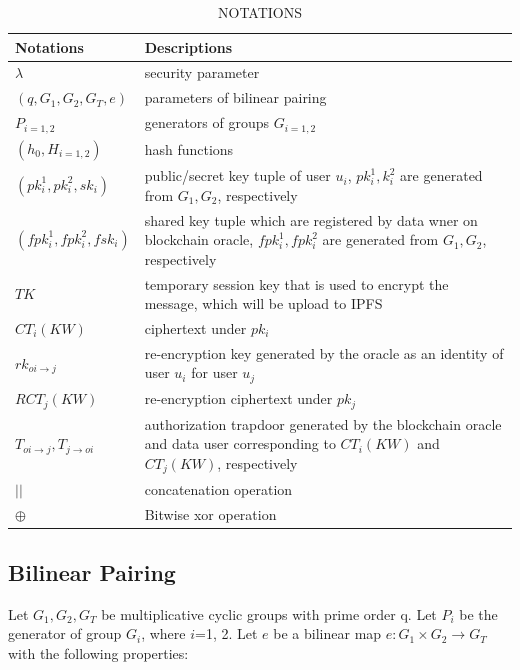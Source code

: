 \documentclass[journal]{IEEEtran}
\begin{document}
\begin{table}[t!]
\caption{NOTATIONS}
\label{tab:notation}
\centering
\begin{tabular}{ |p{2.3cm}|p{5.5cm}|}
\hline
    Notations & Descriptions \\
\hline
    $\lambda$ & security parameter \\
\hline
    $(q, G_1, G_2, G_T, e)$ & parameters of bilinear pairing \\
\hline
    $P_{i=1,2}$ & generators of groups $G_{i=1,2}$ \\
\hline
    $(h_0, H_{i=1,2})$ & hash functions \\
\hline
    $(pk_i^1, pk_i^2, sk_i)$ & public/secret key tuple of user $u_i$, $pk_i^1, k_i^2$ are generated from $G_1, G_2$, respectively \\
\hline
    $(fpk_i^1, fpk_i^2, fsk_i)$ & shared key tuple which are registered by data wner on blockchain oracle, $fpk_i^1, fpk_i^2$ are generated from $G_1, G_2$, respectively  \\
\hline
    $TK$ & temporary session key that is used to encrypt the message, which will be upload to IPFS \\
\hline
    $CT_i(KW)$ & ciphertext under $pk_i$ \\
\hline
    $rk_{oi \to j}$ & re-encryption key generated by the oracle as an identity of user $u_i$ for user $u_j$ \\
\hline
    $RCT_j(KW)$ & re-encryption ciphertext under $pk_j$ \\
\hline
    $T_{oi \to j}, T_{j \to oi}$ & authorization trapdoor generated by the blockchain oracle and data user corresponding to $CT_i(KW)$ and $CT_j(KW)$, respectively \\
\hline
    $||$ & concatenation operation \\
\hline
    $\oplus$ & Bitwise xor operation \\
\hline
\end{tabular}
\end{table}  
     
    \subsection{Bilinear Pairing}
    
    Let $G_1, G_2, G_T$ be multiplicative cyclic groups with prime order q. Let $P_i$ be the generator of group $G_i$, where $i$=1, 2. Let $e$ be a bilinear map $e : G_1 \times G_2 \to G_T$ with the following properties:
    
\end{document}
